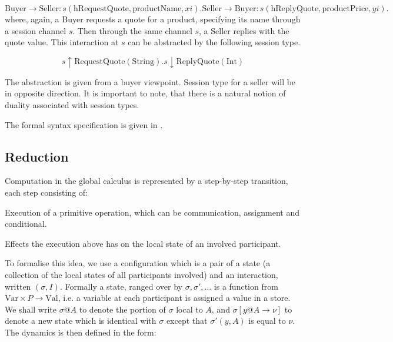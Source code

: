 \begin{subequations}
\begin{equation}
\text{Buyer} \rightarrow \text{Seller} : s(\text{hRequestQuote}, \text{productName}, xi).
\end{equation}
\begin{equation}
\text{Seller} \rightarrow \text{Buyer} : s(\text{hReplyQuote}, \text{productPrice}, yi).
\end{equation}
\end{subequations}
where, again, a Buyer requests a quote for a product, specifying its name through a session channel $s$. Then through the same channel $s$, a Seller replies with the quote value. This interaction at $s$ can be abstracted by the following session type.

\begin{equation}
s \uparrow \text{RequestQuote}(\text{String}).s \downarrow \text{ReplyQuote}(\text{Int})
\end{equation}

The abstraction is given from a buyer viewpoint. Session type for a seller will be in opposite direction. It is important to note, that there is a natural notion of duality associated with session types.

The formal syntax specification is given in \cite{structured-com-centered-prog}.

\subsection{Reduction}

Computation in the global calculus is represented by a step-by-step transition, each step consisting of:

\begin{compactenum}
\item  Execution of a primitive operation, which can be communication, assignment and conditional.

\item  Effects the execution above has on the local state of an involved participant.
\end{compactenum}

To formalise this idea, we use a configuration which is a pair of a state (a collection of the local states of all participants involved) and an interaction, written $(\sigma, I)$. Formally a state, ranged over by $\sigma, \sigma', \ldots$ is a function from $\text{Var} \times P \rightarrow \text{Val}$, i.e. a variable at each participant is assigned a value in a store. We shall write $\sigma @ A$ to denote the portion of $\sigma$ local to $A$, and $\sigma[ y @ A \rightarrow \nu]$ to denote a new state which is identical with $\sigma$ except that $\sigma'(y, A)$ is equal to $\nu$. The dynamics is then defined in the form:

